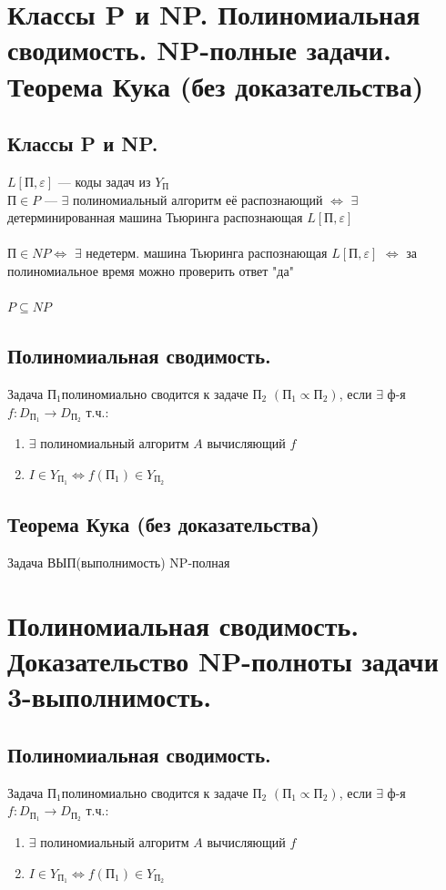 \documentclass[12pt]{article}
\begin{document}
\section{Классы P и NP. Полиномиальная сводимость. NP-полные задачи. Теорема Кука (без доказательства)}
\subsection{Классы P и NP.}
	$L[П, \varepsilon]$ — {коды задач из $Y_П$}\\
	$П \in P$ — $\exists$ полиномиальный алгоритм её распознающий $\Leftrightarrow$ $\exists$ детерминированная машина Тьюринга распознающая $L[П, \varepsilon]$\\\\
	$П \in NP \Leftrightarrow$ $\exists$ недетерм. машина Тьюринга распознающая $L[П, \varepsilon]$ $\Leftrightarrow$ за полиномиальное время можно проверить ответ "да"\\\\
	$P \subseteq NP$\\
\subsection{Полиномиальная сводимость.}
	Задача $П_1$полиномиально сводится к задаче $П_2$ $(П_1 \propto П_2)$, если $\exists$ ф-я $f: D_{П_1} \to D_{П_2}$ т.ч.:
	\begin{enumerate}
		\item $\exists$ полиномиальный алгоритм $A$ вычисляющий $f$
		\item $I \in Y_{П_1} \Leftrightarrow f(П_1) \in Y_{П_2}$
	\end{enumerate}
\subsection{Теорема Кука (без доказательства)}
	Задача ВЫП(выполнимость) NP-полная

\section{Полиномиальная сводимость. Доказательство NP-полноты задачи 3-выполнимость.}
\subsection{Полиномиальная сводимость.}
	Задача $П_1$полиномиально сводится к задаче $П_2$ $(П_1 \propto П_2)$, если $\exists$ ф-я $f: D_{П_1} \to D_{П_2}$ т.ч.:
	\begin{enumerate}
		\item $\exists$ полиномиальный алгоритм $A$ вычисляющий $f$
		\item $I \in Y_{П_1} \Leftrightarrow f(П_1) \in Y_{П_2}$
	\end{enumerate}
\end{document}
